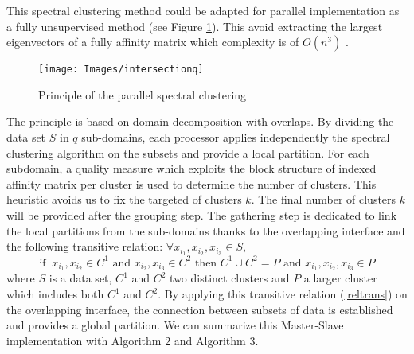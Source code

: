 \documentclass{llncs}
\begin{document}
This spectral clustering method could be adapted for parallel implementation \cite{mouysset3} as a fully unsupervised method (see Figure \ref{parallel}). This avoid extracting the largest eigenvectors of a fully affinity matrix which complexity is of $O(n^3)$ \cite{yan2009fast}.
 
\begin{figure}
  \begin{center}
  {\texttt{[image: Images/intersectionq]}}
\end{center}
\caption{Principle of the parallel spectral clustering}
\label{parallel}
\end{figure}
The principle is based on domain decomposition with overlaps. 
By dividing the data set $S$ in $q$ sub-domains, each processor applies
independently the spectral clustering algorithm on the subsets and provide a
local partition. For each subdomain, a quality measure which exploits the
block structure of indexed affinity matrix per cluster is used to determine
the number of clusters. This heuristic avoids us to fix the targeted of clusters $k$. The final number of clusters $k$ will be provided after the grouping step.  
The gathering step is dedicated to link the local partitions from the sub-domains thanks to the overlapping interface and the following 
 transitive relation: $\forall x_{i_1}, x_{i_2}, x_{i_3} \in S,$
\begin{equation}
\text{if } \ x_{i_1},x_{i_2} \in C^1  \text{ and }  x_{i_2}, x_{i_3} \in C^2 \text{ then } C^1 \cup C^2 = P \text{ and } x_{i_1},x_{i_2}, x_{i_3} \in P \label{reltrans}
\end{equation}
where $S$ is a data set, $C^1$ and $C^2$ two distinct clusters and $P$ a larger cluster which includes both $C^1$ and $C^2$. 
By applying this transitive relation (\ref{reltrans})  on the overlapping interface, the connection between subsets of data is established and provides a
global partition.
We can summarize this Master-Slave implementation with Algorithm 2 and Algorithm 3.
\end{document}
